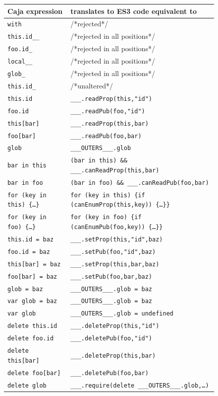 \documentclass[letterpaper,twocolumn,10pt]{article}
\newcommand{\code}[1]{{\tt {#1}}}              %
\begin{document}
\begin{figure}
\begin{tabular}{ll}
  Caja expression    & translates to ES3 code equivalent to\\ 
  \hline
  \code{with}        & /*rejected*/ \\
  \hline
  \code{this.id\_\_} & /*rejected in all positions*/ \\
  \code{foo.id\_}    & /*rejected in all positions*/ \\      
  \code{local\_\_}   & /*rejected in all positions*/ \\        
  \code{glob\_}      & /*rejected in all positions*/ \\        
  \hline
  \code{this.id\_}   & /*unaltered*/ \\
  \code{this.id}     & \code{\_\_\_.readProp(this,"id")}\\
  \code{foo.id}      & \code{\_\_\_.readPub(foo,"id")} \\
  \code{this[bar]}   & \code{\_\_\_.readProp(this,bar)} \\
  \code{foo[bar]}    & \code{\_\_\_.readPub(foo,bar)}  \\
  \code{glob}        & \code{\_\_\_OUTERS\_\_\_.glob} \\
  \hline
  \code{bar in this}           
    & \code{(bar in this) \&\& \_\_\_.canReadProp(this,bar)} \\
  \code{bar in foo}            
    & \code{(bar in foo) \&\& \_\_\_.canReadPub(foo,bar)} \\
  \code{for (key in this)\ \{\ldots\}} 
    &\code{for (key in this)\ \{if (canEnumProp(this,key))\ \{\ldots\}\}}\\
  \code{for (key in foo)\ \{\ldots\}}  
    & \code{for (key in foo)\ \{if (canEnumPub(foo,key))\ \{\ldots\}\}} \\
  \hline
  \code{this.id = baz}    & \code{\_\_\_.setProp(this,"id",baz)} \\
  \code{foo.id = baz}     & \code{\_\_\_.setPub(foo,"id",baz)} \\
  \code{this[bar] = baz}  & \code{\_\_\_.setProp(this,bar,baz)} \\
  \code{foo[bar] = baz}   & \code{\_\_\_.setPub(foo,bar,baz)} \\
  \code{glob = baz}       & \code{\_\_\_OUTERS\_\_\_.glob = baz} \\
  \code{var glob = baz}   & \code{\_\_\_OUTERS\_\_\_.glob = baz} \\
  \code{var glob}         & \code{\_\_\_OUTERS\_\_\_.glob = undefined} \\
  \hline               
  \code{delete this.id}   & \code{\_\_\_.deleteProp(this,"id")} \\
  \code{delete foo.id}    & \code{\_\_\_.deletePub(foo,"id")} \\
  \code{delete this[bar]} & \code{\_\_\_.deleteProp(this,bar)} \\
  \code{delete foo[bar]}  & \code{\_\_\_.deletePub(foo,bar)} \\
  \code{delete glob}      
         & \code{\_\_\_.require(delete \_\_\_OUTERS\_\_\_.glob,\ldots)} \\
\end{tabular}


\end{figure}
\end{document}

